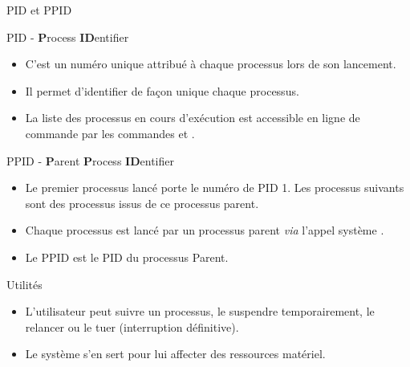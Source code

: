 \begin{frame}{PID et PPID}
  \begin{block}{PID - \textbf{P}rocess \textbf{ID}entifier}
    \begin{itemize}
    \item C'est un numéro unique attribué à chaque processus lors de son
      lancement.
    \item Il permet d'identifier de façon unique chaque processus.
    \item La liste des processus en cours d'exécution est accessible en
      ligne de commande par les commandes  et .
    \end{itemize}
  \end{block}
  \begin{block}{PPID - \textbf{P}arent \textbf{P}rocess
      \textbf{ID}entifier}
    \begin{itemize}
    \item Le premier processus lancé porte le numéro de PID 1. Les
      processus suivants sont des processus issus de ce processus
      parent.
    \item Chaque processus est lancé par un processus parent
      \textit{via} l'appel système .
    \item Le PPID est le PID du processus Parent.
    \end{itemize}
  \end{block}
  \begin{block}{Utilités}
    \begin{itemize}
    \item L'utilisateur peut suivre un processus, le suspendre
      temporairement, le relancer ou le tuer (interruption définitive).
    \item Le système s'en sert pour lui affecter des ressources
      matériel.
    \end{itemize}
  \end{block}
\end{frame}

